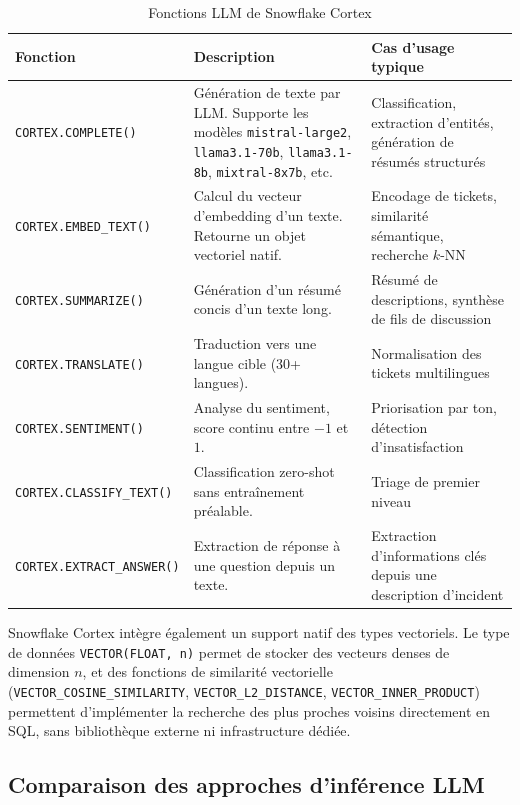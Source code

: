 \begin{table}[h!]
\centering
\begin{tabularx}{\textwidth}{|l|X|X|}
  \hline
  \textbf{Fonction} & \textbf{Description} & \textbf{Cas d'usage typique} \\
  \hline
  \texttt{CORTEX.COMPLETE()} & Génération de texte par LLM. Supporte les modèles \texttt{mistral-large2}, \texttt{llama3.1-70b}, \texttt{llama3.1-8b}, \texttt{mixtral-8x7b}, etc. & Classification, extraction d'entités, génération de résumés structurés \\
  \hline
  \texttt{CORTEX.EMBED\_TEXT()} & Calcul du vecteur d'embedding d'un texte. Retourne un objet vectoriel natif. & Encodage de tickets, similarité sémantique, recherche $k$-NN \\
  \hline
  \texttt{CORTEX.SUMMARIZE()} & Génération d'un résumé concis d'un texte long. & Résumé de descriptions, synthèse de fils de discussion \\
  \hline
  \texttt{CORTEX.TRANSLATE()} & Traduction vers une langue cible (30+ langues). & Normalisation des tickets multilingues \\
  \hline
  \texttt{CORTEX.SENTIMENT()} & Analyse du sentiment, score continu entre $-1$ et $1$. & Priorisation par ton, détection d'insatisfaction \\
  \hline
  \texttt{CORTEX.CLASSIFY\_TEXT()} & Classification zero-shot sans entraînement préalable. & Triage de premier niveau \\
  \hline
  \texttt{CORTEX.EXTRACT\_ANSWER()} & Extraction de réponse à une question depuis un texte. & Extraction d'informations clés depuis une description d'incident \\
  \hline
\end{tabularx}
\caption{Fonctions LLM de Snowflake Cortex}
\label{tab:cortex_fonctions}
\end{table}

Snowflake Cortex intègre également un support natif des types vectoriels. Le type de données \texttt{VECTOR(FLOAT, n)} permet de stocker des vecteurs denses de dimension $n$, et des fonctions de similarité vectorielle (\texttt{VECTOR\_COSINE\_SIMILARITY}, \texttt{VECTOR\_L2\_DISTANCE}, \texttt{VECTOR\_INNER\_PRODUCT}) permettent d'implémenter la recherche des plus proches voisins directement en SQL, sans bibliothèque externe ni infrastructure dédiée.

\subsection{Comparaison des approches d'inférence LLM}

